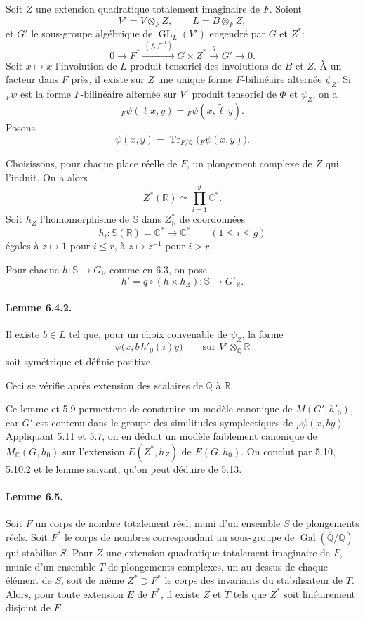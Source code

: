 \documentclass[10pt]{article}
\newcommand{\C}{\mathbb C}
\newcommand{\Q}{\mathbb Q}
\newcommand{\R}{\mathbb R}
\newcommand{\bS}{\mathbb S}
\newcommand{\GL}{\operatorname{GL}}
\newcommand{\Gal}{\operatorname{Gal}}
\newcommand{\MC}{M_{\C}}
\newcommand{\Tr}{\operatorname{Tr}}
\begin{document}
Soit $Z$ une extension quadratique totalement imaginaire de $F$. Soient
\[
V'=V\otimes_F Z,\qquad L=B\otimes_F Z,
\]
et $G'$ le sous-groupe algébrique de $\GL_L(V')$ engendré par $G$ et $Z^*$:
\[
\tag{6.4.1}
0\longrightarrow F^*\xrightarrow{\ (f,f^{-1})\ }G\times Z^*
 \xrightarrow{\ q\ }G'\longrightarrow0.
\]
Soit $x\mapsto\widetilde x$ l'involution de $L$ produit tensoriel des involutions de $B$ et $Z$. À un facteur dans $F$ près, il existe sur $Z$ une unique forme $F$-bilinéaire alternée $\psi_Z$. Si ${}_F\psi$ est la forme $F$-bilinéaire alternée sur $V'$ produit tensoriel de $\Phi$ et $\psi_Z$, on a
\[
{}_F\psi(\ell x,y)={}_F\psi(x,\widetilde\ell\,y).
\]
Posons
\[
\psi(x,y)=\Tr_{F/\Q}\bigl({}_F\psi(x,y)\bigr).
\]

Choisissons, pour chaque place réelle de $F$, un plongement complexe de $Z$ qui l'induit. On a alors
\[
Z^*(\R)\simeq\prod_{i=1}^g \C^*.
\]
Soit $h_Z$ l'homomorphisme de $\bS$ dans $Z^*_\R$ de coordonnées
\[
h_i:\bS(\R)=\C^*\longrightarrow\C^*\qquad(1\le i\le g)
\]
égales à $z\mapsto1$ pour $i\le r$, à $z\mapsto z^{-1}$ pour $i>r$.

Pour chaque $h:\bS\to G_\R$ comme en 6.3, on pose
\[
h'=q\circ(h\times h_Z):\bS\longrightarrow G'_\R.
\]

\paragraph{Lemme 6.4.2.} Il existe $b\in L$ tel que, pour un choix convenable de $\psi_Z$, la forme
\[
\psi\bigl(x,b\,h'_0(i)y\bigr)\qquad\text{sur }V'\otimes_\Q\R
\]
soit symétrique et définie positive.

Ceci se vérifie après extension des scalaires de $\Q$ à $\R$.

Ce lemme et 5.9 permettent de construire un modèle canonique de $M(G',h'_0)$, car $G'$ est contenu dans le groupe des similitudes symplectiques de ${}_F\psi(x,by)$. Appliquant 5.11 et 5.7, on en déduit un modèle faiblement canonique de $\MC(G,h_0)$ sur l'extension $E(Z^*,h_Z)$ de $E(G,h_0)$. On conclut par 5.10, 5.10.2 et le lemme suivant, qu'on peut déduire de 5.13.

\paragraph{Lemme 6.5.} Soit $F$ un corps de nombre totalement réel, muni d'un ensemble $S$ de plongements réels. Soit $F^\ast$ le corps de nombres correspondant au sous-groupe de $\Gal(\overline{\Q}/\Q)$ qui stabilise $S$. Pour $Z$ une extension quadratique totalement imaginaire de $F$, munie d'un ensemble $T$ de plongements complexes, un au-dessus de chaque élément de $S$, soit de même $Z^\ast\supset F^\ast$ le corps des invariants du stabilisateur de $T$. Alors, pour toute extension $E$ de $F^\ast$, il existe $Z$ et $T$ tels que $Z^\ast$ soit linéairement disjoint de $E$.
\end{document}
